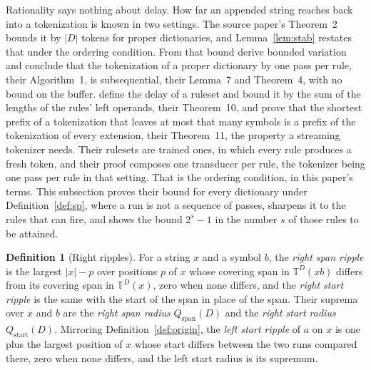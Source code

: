 \documentclass[11pt,a4paper]{article}
\theoremstyle{definition}
\newtheorem{definition}{Definition}
\theoremstyle{plain}
\newcommand{\T}{\mathbb{T}}
\begin{document}
Rationality says nothing about delay. How far an appended string reaches back into a tokenization is known in two
settings. The source paper's Theorem~2 bounds it by \(|D|\) tokens for proper dictionaries, and Lemma~\ref{lem:stab}
restates that under the ordering condition. From that bound \citet{berglund2024dfa} derive bounded variation and
conclude that the tokenization of a proper dictionary by one pass per rule, their Algorithm~1, is subsequential, their
Lemma~7 and Theorem~4, with no bound on the buffer. \citet{mamouras2026bpe} define the delay of a ruleset and bound it
by the sum of the lengths of the rules' left operands, their Theorem~10, and prove that the shortest prefix of a
tokenization that leaves at most that many symbols is a prefix of the tokenization of every extension, their Theorem~11,
the property a streaming tokenizer needs. Their rulesets are trained ones, in which every rule produces a fresh token,
and their proof composes one transducer per rule, the tokenizer being one pass per rule in that setting. That is the
ordering condition, in this paper's terms. This subsection proves their bound for every dictionary under
Definition~\ref{def:sp}, where a run is not a sequence of passes, sharpens it to the rules that can fire, and shows the
bound \(2^{s} - 1\) in the number \(s\) of those rules to be attained.

\begin{definition}[Right ripples]\label{def:rightripple}
For a string \(x\) and a symbol \(b\), the \emph{right span ripple} is the largest \(|x| - p\) over positions \(p\) of
\(x\) whose covering span in \(\T^D(xb)\) differs from its covering span in \(\T^D(x)\), zero when none differs, and the
\emph{right start ripple} is the same with the start of the span in place of the span. Their suprema over \(x\) and
\(b\) are the \emph{right span radius} \(Q_{\mathrm{span}}(D)\) and the \emph{right start radius}
\(Q_{\mathrm{start}}(D)\). Mirroring Definition~\ref{def:origin}, the \emph{left start ripple} of \(a\) on \(x\) is one
plus the largest position of \(x\) whose start differs between the two runs compared there, zero when none differs, and
the left start radius is its supremum.
\end{definition}
\end{document}
